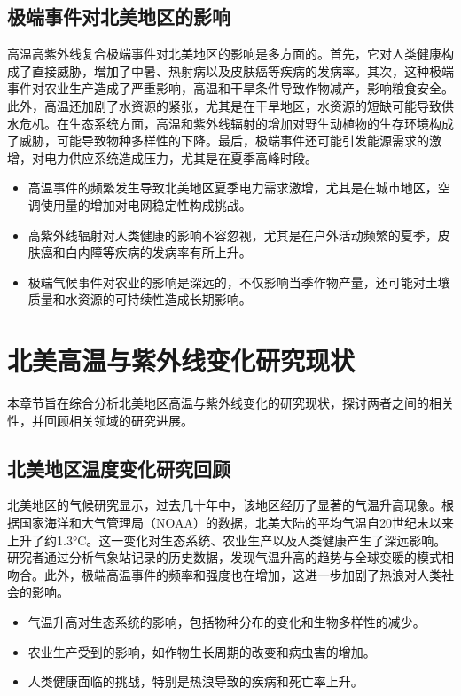 \documentclass[12pt]{article}
\begin{document}
\subsection{极端事件对北美地区的影响}
高温高紫外线复合极端事件对北美地区的影响是多方面的。首先，它对人类健康构成了直接威胁，增加了中暑、热射病以及皮肤癌等疾病的发病率。其次，这种极端事件对农业生产造成了严重影响，高温和干旱条件导致作物减产，影响粮食安全。此外，高温还加剧了水资源的紧张，尤其是在干旱地区，水资源的短缺可能导致供水危机。在生态系统方面，高温和紫外线辐射的增加对野生动植物的生存环境构成了威胁，可能导致物种多样性的下降。最后，极端事件还可能引发能源需求的激增，对电力供应系统造成压力，尤其是在夏季高峰时段。

\begin{itemize}
\item 高温事件的频繁发生导致北美地区夏季电力需求激增，尤其是在城市地区，空调使用量的增加对电网稳定性构成挑战。
\item 高紫外线辐射对人类健康的影响不容忽视，尤其是在户外活动频繁的夏季，皮肤癌和白内障等疾病的发病率有所上升。
\item 极端气候事件对农业的影响是深远的，不仅影响当季作物产量，还可能对土壤质量和水资源的可持续性造成长期影响。
\end{itemize}



\section{北美高温与紫外线变化研究现状}
本章节旨在综合分析北美地区高温与紫外线变化的研究现状，探讨两者之间的相关性，并回顾相关领域的研究进展。

\subsection{北美地区温度变化研究回顾}
北美地区的气候研究显示，过去几十年中，该地区经历了显著的气温升高现象。根据国家海洋和大气管理局（NOAA）的数据，北美大陆的平均气温自20世纪末以来上升了约1.3°C。这一变化对生态系统、农业生产以及人类健康产生了深远影响。研究者通过分析气象站记录的历史数据，发现气温升高的趋势与全球变暖的模式相吻合。此外，极端高温事件的频率和强度也在增加，这进一步加剧了热浪对人类社会的影响。

\begin{itemize}
\item 气温升高对生态系统的影响，包括物种分布的变化和生物多样性的减少。
\item 农业生产受到的影响，如作物生长周期的改变和病虫害的增加。
\item 人类健康面临的挑战，特别是热浪导致的疾病和死亡率上升。
\end{itemize}
\end{document}
